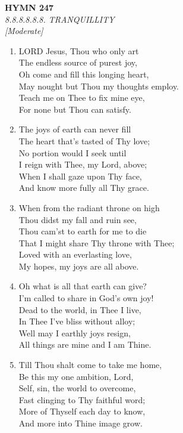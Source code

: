 \newpage
\begin{center}
    {\Large \textbf{HYMN 247}}
    \\
    \textit{8.8.8.8.8.8. TRANQUILLITY}
    \\
    \textit{\small [Moderate]}
\end{center}
\vspace{1em}

\begin{enumerate}
    \item LORD Jesus, Thou who only art \\
        The endless source of purest joy, \\
        Oh come and fill this longing heart, \\
        May nought but Thou my thoughts employ. \\
        Teach me on Thee to fix mine eye, \\
        For none but Thou can satisfy.

    \item The joys of earth can never fill \\
        The heart that's tasted of Thy love; \\
        No portion would I seek until \\
        I reign with Thee, my Lord, above; \\
        When I shall gaze upon Thy face, \\
        And know more fully all Thy grace.

    \item When from the radiant throne on high \\
        Thou didst my fall and ruin see, \\
        Thou cam'st to earth for me to die \\
        That I might share Thy throne with Thee; \\
        Loved with an everlasting love, \\
        My hopes, my joys are all above.

    \item Oh what is all that earth can give? \\
        I'm called to share in God's own joy! \\
        Dead to the world, in Thee I live, \\
        In Thee I've bliss without alloy; \\
        Well may I earthly joys resign, \\
        All things are mine and I am Thine.

    \item Till Thou shalt come to take me home, \\
        Be this my one ambition, Lord, \\
        Self, sin, the world to overcome, \\
        Fast clinging to Thy faithful word; \\
        More of Thyself each day to know, \\
        And more into Thine image grow.

\end{enumerate}

